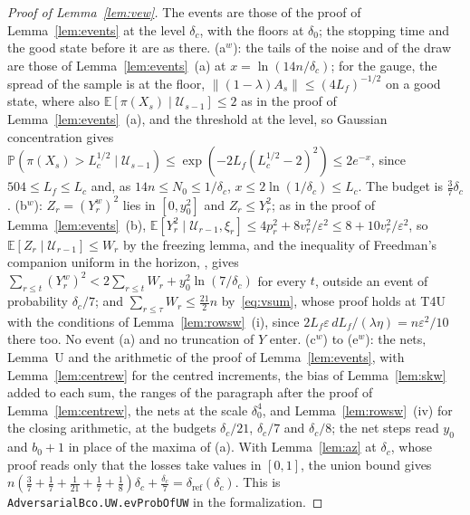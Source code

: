 \documentclass[11pt]{amsart}
\theoremstyle{definition}
\numberwithin{equation}{section}
\newcommand{\E}{\mathbb{E}}
\newcommand{\Prob}{\mathbb{P}}
\begin{document}
\begin{proof}[Proof of Lemma~\ref{lem:vew}]
The events are those of the proof of Lemma~\ref{lem:events} at the level $\delta_c$, with the floors at $\delta_0$; the stopping time and the good state before it are as there. (a$^w$): the tails of the noise and of the draw are those of Lemma~\ref{lem:events}~(a) at $x=\ln(14n/\delta_c)$; for the gauge, the spread of the sample is at the floor, $\|(1-\lambda)A_s\|\le(4L_f)^{-1/2}$ on a good state, where also $\E[\pi(X_s)\mid\mathcal U_{s-1}]\le2$ as in the proof of Lemma~\ref{lem:events}~(a), and the threshold at the level, so Gaussian concentration gives $\Prob(\pi(X_s)>L_c^{1/2}\mid\mathcal U_{s-1})\le\exp(-2L_f(L_c^{1/2}-2)^2)\le2e^{-x}$, since $504\le L_f\le L_c$ and, as $14n\le N_0\le1/\delta_c$, $x\le2\ln(1/\delta_c)\le L_c$. The budget is $\frac37\delta_c$. (b$^w$): $Z_r=(Y^w_r)^2$ lies in $[0,y_0^2]$ and $Z_r\le Y_r^2$; as in the proof of Lemma~\ref{lem:events}~(b), $\E[Y_r^2\mid\mathcal U_{r-1},\xi_r]\le4p_r^2+8v_r^2/\varepsilon^2\le8+10v_r^2/\varepsilon^2$, so $\E[Z_r\mid\mathcal U_{r-1}]\le W_r$ by the freezing lemma, and the inequality of Freedman's companion uniform in the horizon, \cite[Theorem~B.22]{Lat24}, gives $\sum_{r\le t}(Y^w_r)^2<2\sum_{r\le t}W_r+y_0^2\ln(7/\delta_c)$ for every $t$, outside an event of probability $\delta_c/7$; and $\sum_{r\le\tau}W_r\le\frac{21}2n$ by~\eqref{eq:vsum}, whose proof holds at T4U with the conditions of Lemma~\ref{lem:rowsw}~(i), since $2L_f\varepsilon\,dL_f/(\lambda\eta)=n\varepsilon^2/10$ there too. No event (a) and no truncation of $Y$ enter. (c$^w$) to (e$^w$): the nets, Lemma~U and the arithmetic of the proof of Lemma~\ref{lem:events}, with Lemma~\ref{lem:centrew} for the centred increments, the bias of Lemma~\ref{lem:skw} added to each sum, the ranges of the paragraph after the proof of Lemma~\ref{lem:centrew}, the nets at the scale $\delta_0^4$, and Lemma~\ref{lem:rowsw}~(iv) for the closing arithmetic, at the budgets $\delta_c/21$, $\delta_c/7$ and $\delta_c/8$; the net steps read $y_0$ and $b_0+1$ in place of the maxima of (a). With Lemma~\ref{lem:az} at $\delta_c$, whose proof reads only that the losses take values in $[0,1]$, the union bound gives $n(\frac37+\frac17+\frac1{21}+\frac17+\frac18)\delta_c+\frac{\delta_c}7=\delta_{\mathrm{ref}}(\delta_c)$. This is \texttt{AdversarialBco.\allowbreak UW.\allowbreak evProbOfUW} in the formalization.
\end{proof}
\end{document}
